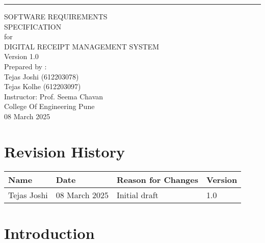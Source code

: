 \documentclass[12pt]{article}
\begin{document}
\begin{flushright}
    \rule{16cm}{5pt}\vskip0.5cm %
    \begin{bfseries}
        {\Large SOFTWARE REQUIREMENTS\\ SPECIFICATION}\\
        \vspace{1.0cm} %
        {\large for}\\
        \vspace{1.0cm} %
        {\Large DIGITAL RECEIPT MANAGEMENT SYSTEM}\\
        \vspace{1.0cm} %
        {\large Version 1.0}\\
        \vspace{1.0cm} %
        {\large Prepared by : \\}
        {\large Tejas Joshi (612203078)\\}
        {\large Tejas Kolhe (612203097)\\}
        \vspace{1.0cm} %
        {\large Instructor: Prof. Seema Chavan \\}
        \vspace{1.0cm} %
        {\large College Of Engineering Pune\\}
        \vspace{1.0cm} %
        {\large 08 March 2025\\}
        \vspace{2.2cm}
    \end{bfseries}
\end{flushright}

\tableofcontents
\newpage

\section*{Revision History}
\begin{tabular}{|l|l|l|l|}
\hline
\textbf{Name} & \textbf{Date} & \textbf{Reason for Changes} & \textbf{Version} \\
\hline
Tejas Joshi & 08 March 2025 & Initial draft & 1.0 \\
\hline
\end{tabular}

\section{Introduction}
\end{document}
